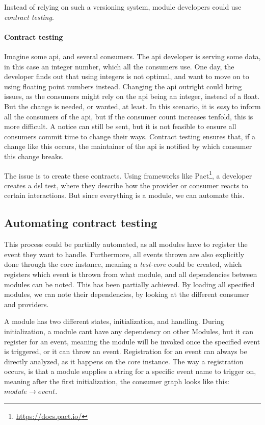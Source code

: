 Instead of relying on such a versioning system, module developers could use
\textit{contract testing}.

\paragraph{Contract testing} Imagine some \gls*{api}, and several consumers.
The \gls*{api} developer is serving some data, in this case an integer number,
which all the consumers use. One day, the developer finds out that using
integers is not optimal, and want to move on to using floating point numbers
instead. Changing the \gls*{api} outright could bring issues, as the consumers
might rely on the \gls*{api} being an integer, instead of a float. But the
change is needed, or wanted, at least. In this scenario, it is \textit{easy} to
inform all the consumers of the \gls*{api}, but if the consumer count increases
tenfold, this is more difficult. A notice can still be sent, but it is not
feasible to ensure all consumers commit time to change their ways. Contract
testing ensures that, if a change like this occurs, the maintainer of the
\gls*{api} is notified by which consumer this change breaks.

The issue is to create these contracts. Using frameworks like Pact\footnote{\url{https://docs.pact.io/}},
a developer creates a \gls*{dsl} test, where they describe how the provider or
consumer reacts to certain interactions. But since everything is a module, we
can automate this.

\subsection{Automating contract testing}

This process could be partially automated, as all modules have to register the
event they want to handle. Furthermore, all events thrown are also explicitly
done through the core instance, meaning a \textit{test-core} could be created,
which registers which event is thrown from what module, and all dependencies
between modules can be noted. This has been partially achieved. By loading all
specified modules, we can note their dependencies, by looking at the different
consumer and providers.

A module has two different states, initialization, and handling. During
initialization, a module cant have any dependency on other Modules, but it can
register for an event, meaning the module will be invoked once the specified
event is triggered, or it can throw an event. Registration for an event can
always be directly analyzed, as it happens on the core instance. The way a
registration occurs, is that a module supplies a string for a specific event
name to trigger on, meaning after the first initialization, the consumer graph
looks like this: $module \to event$.

